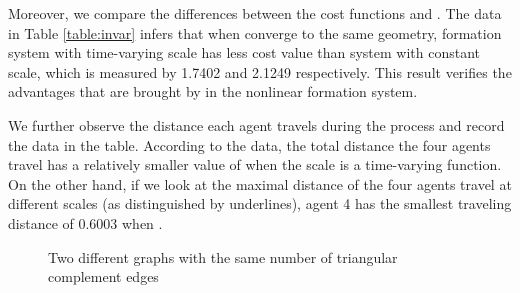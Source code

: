 \documentclass[times]{rncauth}
\begin{document}
Moreover, we compare the differences between the cost functions
 and . The data in Table \ref{table:invar} infers that
when converge to the same geometry, formation system with
time-varying scale  has less cost value than system
with constant scale, which is measured by 1.7402 and 2.1249
respectively. This result verifies the advantages that are brought
by  in the nonlinear formation system.

We further observe the distance each agent travels during the
process and record the data in the table. According to the data, the
total distance the four agents travel has a relatively smaller value
of  when the scale is a time-varying function. On the other
hand, if we look at the maximal distance of the four agents travel
at different scales (as distinguished by underlines), agent 4 has
the smallest traveling distance of 0.6003 when .
\begin{figure}
\caption{Two different graphs with the same number of triangular
complement edges}\label{fig:four_topo}
\end{figure}
\end{document}
